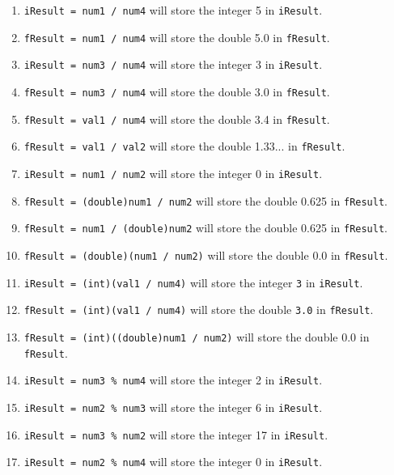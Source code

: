 \documentclass[leqno, 11pt]{article}
\begin{document}
\begin{enumerate}[label=\alph*.]
  \itemsep-0.2em
  \item \texttt{iResult = num1 / num4} will store the integer 5 in \texttt{iResult}.
  \item \texttt{fResult = num1 / num4} will store the double 5.0 in \texttt{fResult}.
  \item \texttt{iResult = num3 / num4} will store the integer 3 in \texttt{iResult}.
  \item \texttt{fResult = num3 / num4} will store the double 3.0 in \texttt{fResult}.
  \item \texttt{fResult = val1 / num4} will store the double 3.4 in \texttt{fResult}.
  \item \texttt{fResult = val1 / val2} will store the double 1.33... in \texttt{fResult}.
  \item \texttt{iResult = num1 / num2} will store the integer 0 in \texttt{iResult}.
  \item \texttt{fResult = (double)num1 / num2} will store the double 0.625 in \texttt{fResult}.
  \item \texttt{fResult = num1 / (double)num2} will store the double 0.625 in \texttt{fResult}.
  \item \texttt{fResult = (double)(num1 / num2)} will store the double 0.0 in \texttt{fResult}.
  \item \texttt{iResult = (int)(val1 / num4)} will store the integer \texttt{3} in \texttt{iResult}.
  \item \texttt{fResult = (int)(val1 / num4)} will store the double \texttt{3.0} in \texttt{fResult}.
  \item \texttt{fResult = (int)((double)num1 / num2)} will store the double 0.0 in \texttt{fResult}.
  \item \texttt{iResult = num3 \% num4} will store the integer 2 in \texttt{iResult}.
  \item \texttt{iResult = num2 \% num3} will store the integer 6 in \texttt{iResult}.
  \item \texttt{iResult = num3 \% num2} will store the integer 17 in \texttt{iResult}.
  \item \texttt{iResult = num2 \% num4} will store the integer 0 in \texttt{iResult}.
\end{enumerate}
\end{document}
